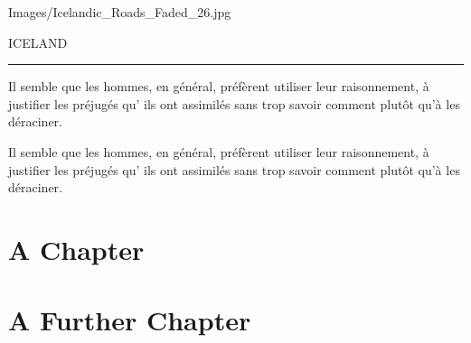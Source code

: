 \documentclass{RVTM}
\begin{document}
\begin{bpdp}{Images/Icelandic_Roads_Faded_26.jpg}%
	\noindent%
	\begingroup
	\color{white}%
	\sffamily\bfseries%
	\vfill
	\begin{center}
		\fontsize{2cm}{2.4cm}\selectfont\highcontrastfont%
		ICELAND\\[1cm]
		\rule{.5\linewidth}{5mm}
	\end{center}
	
	\vfill%
	\noindent\lipsum[3]
	\vfill
	\vfill
	\endgroup
	
	\bpdpnewpage%
	\null%
	\vfill
	\hspace*{-1em}
	\vfill%
\end{bpdp}

\begin{quotationpage}
	Il semble que les hommes, en général, préfèrent utiliser leur raisonnement, à justifier les préjugés qu’ ils ont assimilés sans trop savoir comment plutôt qu'à les déraciner.
\end{quotationpage}

\begin{quotationpage}%
	Il semble que les hommes, en général, préfèrent utiliser leur raisonnement, à justifier les préjugés qu’ ils ont assimilés sans trop savoir comment plutôt qu'à les déraciner.
\end{quotationpage}

\setcounter{page}{30}
\chapter{A Chapter}
%
%
\setcounter{page}{36}
\chapter{A Further Chapter}
\end{document}

